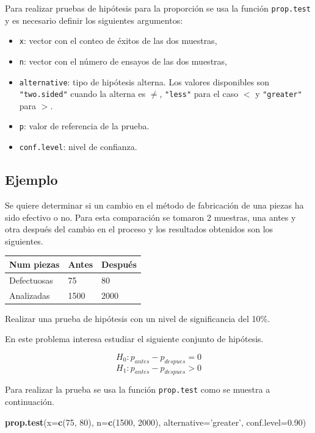 \documentclass[10pt,]{krantz}
\makeatletter
\newenvironment{Shaded}{\begin{snugshade}}{\end{snugshade}}
\newcommand{\KeywordTok}[1]{\textcolor[rgb]{0.13,0.29,0.53}{\textbf{{#1}}}}
\newcommand{\DataTypeTok}[1]{\textcolor[rgb]{0.13,0.29,0.53}{{#1}}}
\newcommand{\DecValTok}[1]{\textcolor[rgb]{0.00,0.00,0.81}{{#1}}}
\newcommand{\FloatTok}[1]{\textcolor[rgb]{0.00,0.00,0.81}{{#1}}}
\newcommand{\StringTok}[1]{\textcolor[rgb]{0.31,0.60,0.02}{{#1}}}
\newcommand{\NormalTok}[1]{{#1}}
\providecommand{\tightlist}{%
  \setlength{\itemsep}{0pt}\setlength{\parskip}{0pt}}
\newenvironment{kframe}{%
\medskip{}
\setlength{\fboxsep}{.8em}
 \def\at@end@of@kframe{}%
 \ifinner\ifhmode%
  \def\at@end@of@kframe{\end{minipage}}%
  \begin{minipage}{\columnwidth}%
 \fi\fi%
 \def\FrameCommand##1{\hskip\@totalleftmargin \hskip-\fboxsep
 \colorbox{shadecolor}{##1}\hskip-\fboxsep
     \hskip-\linewidth \hskip-\@totalleftmargin \hskip\columnwidth}%
 \MakeFramed {\advance\hsize-\width
   \@totalleftmargin\z@ \linewidth\hsize
   \@setminipage}}%
 {\par\unskip\endMakeFramed%
 \at@end@of@kframe}
\renewenvironment{Shaded}{\begin{kframe}}{\end{kframe}}
\makeatother
\begin{document}
Para realizar pruebas de hipótesis para la proporción se usa la función
\texttt{prop.test} y es necesario definir los siguientes argumentos:

\begin{itemize}
\tightlist
\item
  \texttt{x}: vector con el conteo de éxitos de las dos muestras,
\item
  \texttt{n}: vector con el número de ensayos de las dos muestras,
\item
  \texttt{alternative}: tipo de hipótesis alterna. Los valores
  disponibles son \texttt{"two.sided"} cuando la alterna es \(\neq\),
  \texttt{"less"} para el caso \(<\) y \texttt{"greater"} para \(>\).
\item
  \texttt{p}: valor de referencia de la prueba.
\item
  \texttt{conf.level}: nivel de confianza.
\end{itemize}

\subsection*{Ejemplo}\label{ejemplo-69}


Se quiere determinar si un cambio en el método de fabricación de una
piezas ha sido efectivo o no. Para esta comparación se tomaron 2
muestras, una antes y otra después del cambio en el proceso y los
resultados obtenidos son los siguientes.

\begin{longtable}[]{@{}lll@{}}
\toprule
Num piezas & Antes & Después\tabularnewline
\midrule
\endhead
Defectuosas & 75 & 80\tabularnewline
Analizadas & 1500 & 2000\tabularnewline
\bottomrule
\end{longtable}

Realizar una prueba de hipótesis con un nivel de significancia del 10\%.

En este problema interesa estudiar el siguiente conjunto de hipótesis.

\[H_0: p_{antes}  - p_{despues} = 0\]
\[H_1: p_{antes}  - p_{despues} > 0\]

Para realizar la prueba se usa la función \texttt{prop.test} como se
muestra a continuación.

\begin{Shaded}
\begin{Highlighting}[]
\KeywordTok{prop.test}\NormalTok{(}\DataTypeTok{x=}\KeywordTok{c}\NormalTok{(}\DecValTok{75}\NormalTok{, }\DecValTok{80}\NormalTok{), }\DataTypeTok{n=}\KeywordTok{c}\NormalTok{(}\DecValTok{1500}\NormalTok{, }\DecValTok{2000}\NormalTok{),}
          \DataTypeTok{alternative=}\StringTok{'greater'}\NormalTok{, }\DataTypeTok{conf.level=}\FloatTok{0.90}\NormalTok{)}
\end{Highlighting}
\end{Shaded}
\end{document}
